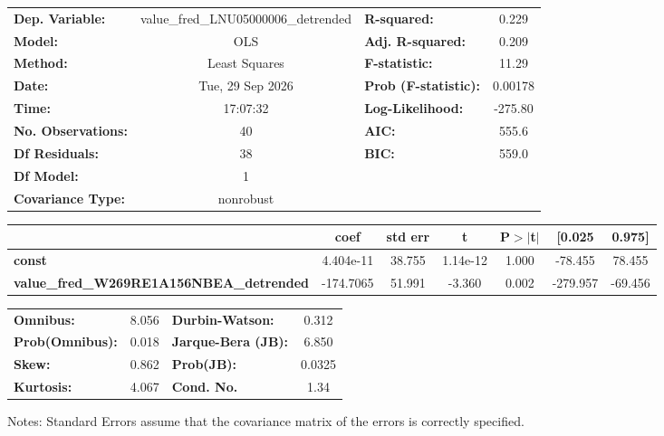 \begin{center}
\begin{tabular}{lclc}
\toprule
\textbf{Dep. Variable:}                          & value\_fred\_LNU05000006\_detrended & \textbf{  R-squared:         } &     0.229   \\
\textbf{Model:}                                  &                 OLS                 & \textbf{  Adj. R-squared:    } &     0.209   \\
\textbf{Method:}                                 &            Least Squares            & \textbf{  F-statistic:       } &     11.29   \\
\textbf{Date:}                                   &           Tue, 29 Sep 2026          & \textbf{  Prob (F-statistic):} &  0.00178    \\
\textbf{Time:}                                   &               17:07:32              & \textbf{  Log-Likelihood:    } &   -275.80   \\
\textbf{No. Observations:}                       &                    40               & \textbf{  AIC:               } &     555.6   \\
\textbf{Df Residuals:}                           &                    38               & \textbf{  BIC:               } &     559.0   \\
\textbf{Df Model:}                               &                     1               & \textbf{                     } &             \\
\textbf{Covariance Type:}                        &              nonrobust              & \textbf{                     } &             \\
\bottomrule
\end{tabular}
\begin{tabular}{lcccccc}
                                                 & \textbf{coef} & \textbf{std err} & \textbf{t} & \textbf{P$> |$t$|$} & \textbf{[0.025} & \textbf{0.975]}  \\
\midrule
\textbf{const}                                   &    4.404e-11  &       38.755     &  1.14e-12  &         1.000        &      -78.455    &       78.455     \\
\textbf{value\_fred\_W269RE1A156NBEA\_detrended} &    -174.7065  &       51.991     &    -3.360  &         0.002        &     -279.957    &      -69.456     \\
\bottomrule
\end{tabular}
\begin{tabular}{lclc}
\textbf{Omnibus:}       &  8.056 & \textbf{  Durbin-Watson:     } &    0.312  \\
\textbf{Prob(Omnibus):} &  0.018 & \textbf{  Jarque-Bera (JB):  } &    6.850  \\
\textbf{Skew:}          &  0.862 & \textbf{  Prob(JB):          } &   0.0325  \\
\textbf{Kurtosis:}      &  4.067 & \textbf{  Cond. No.          } &     1.34  \\
\bottomrule
\end{tabular}
\end{center}

Notes: \newline
 [1] Standard Errors assume that the covariance matrix of the errors is correctly specified.